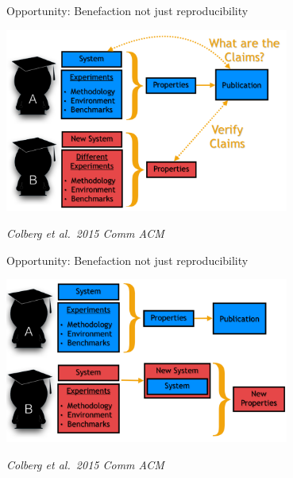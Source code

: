 \documentclass[ignorenonframetext,]{beamer}
\begin{document}
\begin{frame}{Opportunity: Benefaction not just reproducibility}
\protect\hypertarget{opportunity-benefaction-not-just-reproducibility-2}{}

\includegraphics[width=0.7\textwidth,height=\textheight]{colberg_repro.png}

\emph{Colberg et al.~2015 Comm ACM}

\end{frame}

\begin{frame}{Opportunity: Benefaction not just reproducibility}
\protect\hypertarget{opportunity-benefaction-not-just-reproducibility-3}{}

\includegraphics[width=0.7\textwidth,height=\textheight]{colberg_benefact.png}

\emph{Colberg et al.~2015 Comm ACM}

\end{frame}
\end{document}

